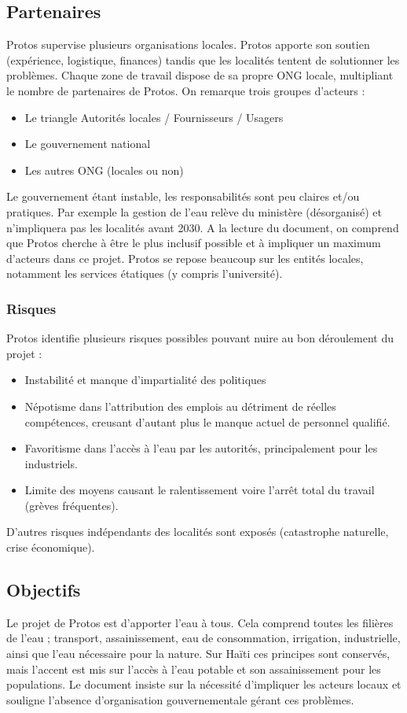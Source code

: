 \documentclass[a4paper, 11pt]{article}
\begin{document}
\subsection*{Partenaires}
Protos supervise plusieurs organisations locales. Protos apporte son soutien (expérience, logistique, finances) tandis que les localités tentent de solutionner les problèmes. Chaque zone de travail dispose de sa propre ONG locale, multipliant le nombre de partenaires de Protos. On remarque trois groupes d'acteurs :
\begin{itemize}
  \item Le triangle Autorités locales / Fournisseurs / Usagers
  \item Le gouvernement national
  \item Les autres ONG (locales ou non)
\end{itemize}

Le gouvernement étant instable, les responsabilités sont peu claires et/ou pratiques. Par exemple la gestion de l'eau relève du ministère (désorganisé) et n'impliquera pas les localités avant 2030. A la lecture du document, on comprend que Protos cherche à être le plus inclusif possible et à impliquer un maximum d'acteurs dans ce projet. Protos se repose beaucoup sur les entités locales, notamment les services étatiques (y compris l'université).
\subsubsection*{Risques}
Protos identifie plusieurs risques possibles pouvant nuire au bon déroulement du projet :
\begin{itemize}
  \item Instabilité et manque d'impartialité des politiques
  \item Népotisme dans l'attribution des emplois au détriment de réelles compétences, creusant d'autant plus le manque actuel de personnel qualifié.
  \item Favoritisme dans l'accès à l'eau par les autorités, principalement pour les industriels.
  \item Limite des moyens causant le ralentissement voire l'arrêt total du travail (grèves fréquentes).
\end{itemize}

D'autres risques indépendants des localités sont exposés (catastrophe naturelle, crise économique).

\subsection*{Objectifs}
Le projet de Protos est d'apporter l'eau à tous. Cela comprend toutes les filières de l'eau ; transport, assainissement, eau de consommation, irrigation, industrielle, ainsi que l'eau nécessaire pour la nature. Sur Haïti ces principes sont conservés, mais l'accent est mis sur l'accès à l'eau potable et son assainissement pour les populations. Le document insiste sur la nécessité d'impliquer les acteurs locaux et souligne l'absence d'organisation gouvernementale gérant ces problèmes.
\end{document}
